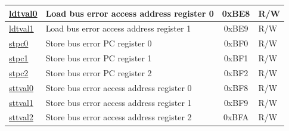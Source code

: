 \begin{longtable}{ | p{4.0cm} | p{8.4cm} | c | l | }
\hyperref[regdesc:LDTVAL0]{ldtval0} & Load bus error access address register 0 & 0xBE8 & R/W \\\hline
\hyperref[regdesc:LDTVAL1]{ldtval1} & Load bus error access address register 1 & 0xBE9 & R/W \\\hline
\hyperref[regdesc:STPC0]{stpc0} & Store bus error PC register 0 & 0xBF0 & R/W \\\hline
\hyperref[regdesc:STPC1]{stpc1} & Store bus error PC register 1 & 0xBF1 & R/W \\\hline
\hyperref[regdesc:STPC2]{stpc2} & Store bus error PC register 2 & 0xBF2 & R/W \\\hline
\hyperref[regdesc:STTVAL0]{sttval0} & Store bus error access address register 0 & 0xBF8 & R/W \\\hline
\hyperref[regdesc:STTVAL1]{sttval1} & Store bus error access address register 1 & 0xBF9 & R/W \\\hline
\hyperref[regdesc:STTVAL2]{sttval2} & Store bus error access address register 2 & 0xBFA & R/W \\\hline
\end{longtable}
